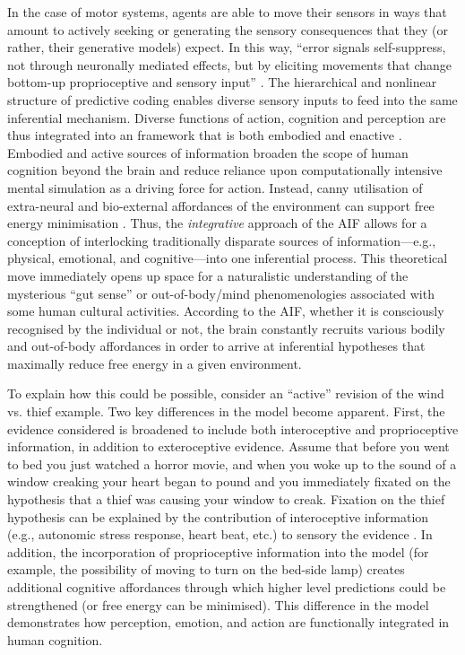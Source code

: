 \begin{CJK}{UTF8}{gbsn}
In the case of motor systems, agents are able to move their sensors in ways that amount to actively seeking or generating the sensory consequences that they (or rather, their generative models) expect.  In this way, ``error signals self-suppress, not through neuronally mediated effects, but by eliciting movements that change bottom-up proprioceptive and sensory input'' \citep[][1349]{Friston2003}.  The hierarchical and nonlinear structure of predictive coding enables diverse sensory inputs to feed into the same inferential mechanism.  Diverse functions of action, cognition and perception are thus integrated into an framework that is both embodied and enactive \citep{Friston2015}.  Embodied and active sources of information broaden the scope of human cognition beyond the brain and reduce reliance upon computationally intensive mental simulation as a driving force for action.  Instead, canny utilisation of extra-neural and bio-external affordances of the environment can support free energy minimisation \citep{Clark2015}.  Thus, the \textit{integrative} approach of the AIF allows for a conception of interlocking traditionally disparate sources of information---e.g., physical, emotional, and cognitive---into one inferential process.  This theoretical move immediately opens up space for a naturalistic understanding of the mysterious ``gut sense'' or out-of-body/mind phenomenologies associated with some human cultural activities.  According to the AIF, whether it is consciously recognised by the individual or not, the brain constantly recruits various bodily and out-of-body affordances in order to arrive at inferential hypotheses that maximally reduce free energy in a given environment.

To explain how this could be possible, consider an ``active'' revision of the wind vs. thief example.  Two key differences in the model become apparent.  First, the evidence considered is broadened to include both interoceptive and proprioceptive information, in addition to exteroceptive evidence.  Assume that before you went to bed you just watched a horror movie, and when you woke up to the sound of a window creaking your heart began to pound and you immediately fixated on the hypothesis that a thief was causing your window to creak.  Fixation on the thief hypothesis can be explained by the contribution of interoceptive information (e.g., autonomic stress response, heart beat, etc.) to sensory the evidence \citep{Pezzulo2014}.  In addition, the incorporation of proprioceptive information into the model (for example, the possibility of moving to turn on the bed-side lamp) creates additional cognitive affordances through which higher level predictions could be strengthened (or free energy can be minimised).  This difference in the model demonstrates how perception, emotion, and action are functionally integrated in human cognition.


\end{CJK}
